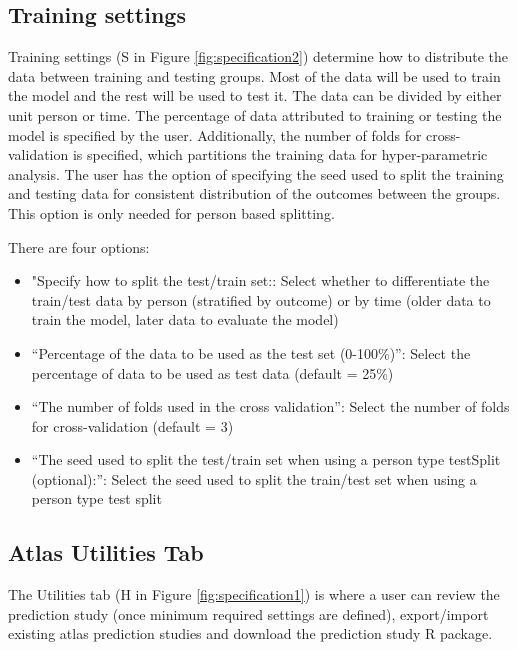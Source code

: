 \documentclass[11pt]{book}
\providecommand{\tightlist}{%
  \setlength{\itemsep}{0pt}\setlength{\parskip}{0pt}}
\theoremstyle{definition}
\theoremstyle{definition}
\theoremstyle{definition}
\theoremstyle{remark}
\begin{document}
\hypertarget{training-settings}{%
\subsection{Training settings}\label{training-settings}}

Training settings (S in Figure \ref{fig:specification2}) determine how to distribute the data between training and testing groups. Most of the data will be used to train the model and the rest will be used to test it. The data can be divided by either unit person or time. The percentage of data attributed to training or testing the model is specified by the user. Additionally, the number of folds for cross-validation is specified, which partitions the training data for hyper-parametric analysis. The user has the option of specifying the seed used to split the training and testing data for consistent distribution of the outcomes between the groups. This option is only needed for person based splitting.

There are four options:

\begin{itemize}
\tightlist
\item
  "Specify how to split the test/train set:: Select whether to differentiate the train/test data by person (stratified by outcome) or by time (older data to train the model, later data to evaluate the model)
\item
  ``Percentage of the data to be used as the test set (0-100\%)'': Select the percentage of data to be used as test data (default = 25\%)
\item
  ``The number of folds used in the cross validation'': Select the number of folds for cross-validation (default = 3)
\item
  ``The seed used to split the test/train set when using a person type testSplit (optional):'': Select the seed used to split the train/test set when using a person type test split
\end{itemize}

\hypertarget{atlas-utilities-tab}{%
\subsection{Atlas Utilities Tab}\label{atlas-utilities-tab}}

The Utilities tab (H in Figure \ref{fig:specification1}) is where a user can review the prediction study (once minimum required settings are defined), export/import existing atlas prediction studies and download the prediction study R package.
\end{document}
